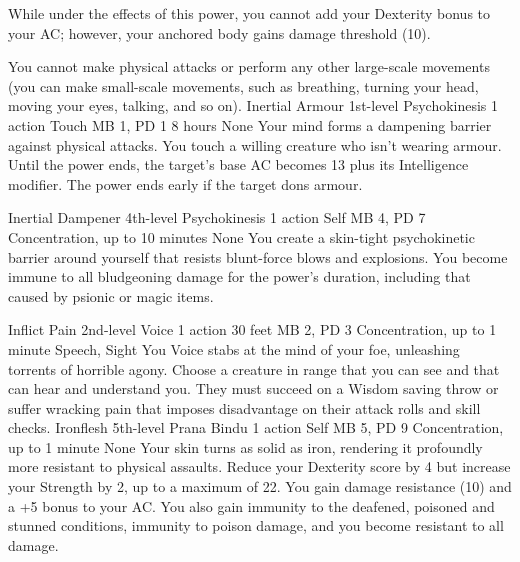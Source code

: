 While under the effects of this power, you cannot add your
Dexterity bonus to your AC; however, your anchored body gains
damage threshold (10).

You cannot make physical attacks or perform any other large-scale
movements (you can make small-scale movements, such as breathing,
turning your head, moving your eyes, talking, and so on).
\DndPowerHeader%
    {Inertial Armour\label{pwr:inertial-armour}}
    {1st-level Psychokinesis}
    {1 action}
    {Touch}
    {MB 1, PD 1}
    {8 hours}
    {None}
Your mind forms a dampening barrier against physical attacks.
You touch a willing creature who isn't wearing armour.
Until the power ends, the target's base AC becomes 13
plus its Intelligence modifier.
The power ends early if the target dons armour.

\DndPowerHeader%
    {Inertial Dampener\label{pwr:inertial-dampener}}
    {4th-level Psychokinesis}
    {1 action}
    {Self}
    {MB 4, PD 7}
    {Concentration, up to 10 minutes}
    {None}
You create a skin-tight psychokinetic barrier
around yourself that resists blunt-force blows and explosions.
You become immune to all bludgeoning damage for the power's duration,
including that caused by psionic or magic items.

\DndPowerHeader%
    {Inflict Pain\label{pwr:inflict-pain}}
    {2nd-level Voice}
    {1 action}
    {30 feet}
    {MB 2, PD 3}
    {Concentration, up to 1 minute}
    {Speech, Sight}
You Voice stabs at the mind of your foe,
unleashing torrents of horrible agony. Choose a creature in
range that you can see and that can hear and understand you.
They must succeed on a Wisdom saving
throw or suffer wracking pain that imposes disadvantage on
their attack rolls and skill checks.
\DndPowerHeader%
    {Ironflesh\label{pwr:ironflesh}}
    {5th-level Prana Bindu}
    {1 action}
    {Self}
    {MB 5, PD 9}
    {Concentration, up to 1 minute}
    {None}
Your skin turns as solid as iron, rendering it profoundly
more resistant to physical assaults.
Reduce your Dexterity score by 4 but increase your Strength by 2,
up to a maximum of 22.
You gain damage resistance (10) and a +5 bonus to your AC.
You also gain immunity to the deafened, poisoned and stunned conditions,
immunity to poison damage,
and you become resistant to all damage.

